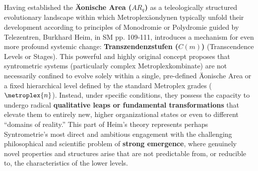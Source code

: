 \documentclass[
    12pt,              %
    a4paper,           %
    headings=normal,   %
    twoside=true,      %
    BCOR=8mm,          %
]{scrbook}
\newcommand{\q}[1]{\enquote{#1}}
\newcommand{\aeonischearea}{AR_q}
\newcommand{\transzendenzstufe}[1]{C(#1)}
\begin{document}
Having established the \textbf{Äonische Area (\(\aeonischearea\))} as a teleologically structured evolutionary landscape within which Metroplexäondynen typically unfold their development according to principles of Monodromie or Polydromie guided by Telezentren, Burkhard Heim, in SM pp. 109-111, introduces a mechanism for even more profound systemic change: \textbf{Transzendenzstufen (\(\transzendenzstufe{m}\))} (Transcendence Levels or Stages). This powerful and highly original concept proposes that syntrometric systems (particularly complex Metroplexkombinate) are not necessarily confined to evolve solely within a single, pre-defined Äonische Area or a fixed hierarchical level defined by the standard Metroplex grades (\(\metroplex{n}\)). Instead, under specific conditions, they possess the capacity to undergo radical \textbf{qualitative leaps or fundamental transformations} that elevate them to entirely new, higher organizational states or even to different \q{domains of reality.} This part of Heim’s theory represents perhaps Syntrometrie’s most direct and ambitious engagement with the challenging philosophical and scientific problem of \textbf{strong emergence}, where genuinely novel properties and structures arise that are not predictable from, or reducible to, the characteristics of the lower levels.
\end{document}
